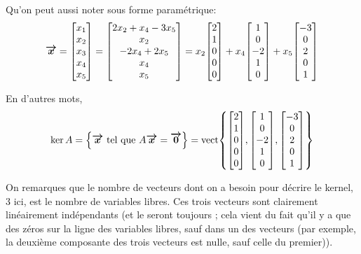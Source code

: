 \documentclass[a4paper]{article}
\begin{document}
{    Qu'on peut aussi noter sous forme paramétrique: 
    \[\bvec{x} = \begin{bmatrix} x_1 \\ x_2 \\ x_3 \\ x_4 \\ x_5 \end{bmatrix} = \begin{bmatrix} 2x_2 + x_4 - 3x_5 \\ x_2 \\ -2x_4 + 2x_5 \\ x_4 \\ x_5 \end{bmatrix} = x_2 \begin{bmatrix} 2 \\ 1 \\ 0 \\ 0 \\ 0 \end{bmatrix} + x_4 \begin{bmatrix} 1 \\ 0 \\ -2 \\ 1 \\ 0 \end{bmatrix} + x_5 \begin{bmatrix} -3 \\ 0 \\ 2 \\ 0 \\ 1 \end{bmatrix} \]
    
    En d'autres mots, 
    \[\ker A = \left\{\bvec{x} \telque A \bvec{x} = \bvec{0}\right\} = \vect\left\{\begin{bmatrix} 2 \\ 1 \\ 0 \\ 0 \\ 0 \end{bmatrix}, \begin{bmatrix} 1 \\ 0 \\ -2 \\ 1 \\ 0 \end{bmatrix}, \begin{bmatrix} -3 \\ 0 \\ 2 \\ 0 \\ 1 \end{bmatrix} \right\}\]
    
    On remarques que le nombre de vecteurs dont on a besoin pour décrire le kernel, 3 ici, est le nombre de variables libres. Ces trois vecteurs sont clairement linéairement indépendants (et le seront toujours ; cela vient du fait qu'il y a que des zéros sur la ligne des variables libres, sauf dans un des vecteurs (par exemple, la deuxième composante des trois vecteurs est nulle, sauf celle du premier)).

}
\end{document}
